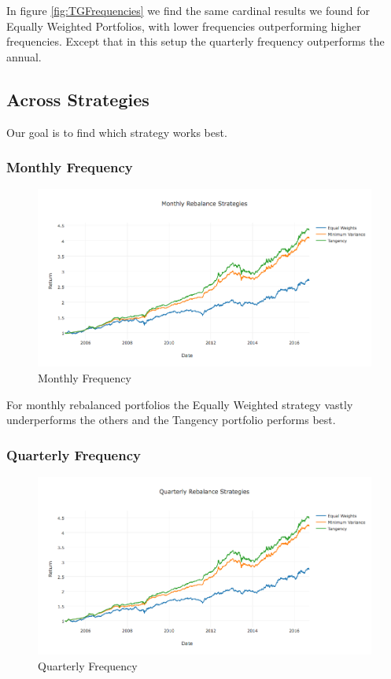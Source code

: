 \documentclass[paper=a4, fontsize=11pt]{scrartcl} %
\numberwithin{equation}{section} %
\numberwithin{figure}{section} %
\numberwithin{table}{section} %
\begin{document}
In figure \ref{fig:TGFrequencies} we find the same cardinal results we found for Equally Weighted Portfolios, with lower frequencies outperforming higher frequencies. Except that in this setup the quarterly frequency outperforms the annual.

\subsection{Across Strategies}

Our goal is to find which strategy works best.

\subsubsection{Monthly Frequency}

\begin{figure}[H]
  \includegraphics[width=\linewidth]{MStrat.png}
  \caption{Monthly Frequency}
  \label{fig:MStrat}
\end{figure}

For monthly rebalanced portfolios the Equally Weighted strategy vastly underperforms the others and the Tangency portfolio performs best.

\subsubsection{Quarterly Frequency}

\begin{figure}[H]
  \includegraphics[width=\linewidth]{QStrat.png}
  \caption{Quarterly Frequency}
  \label{fig:QStrat}
\end{figure}
\end{document}
